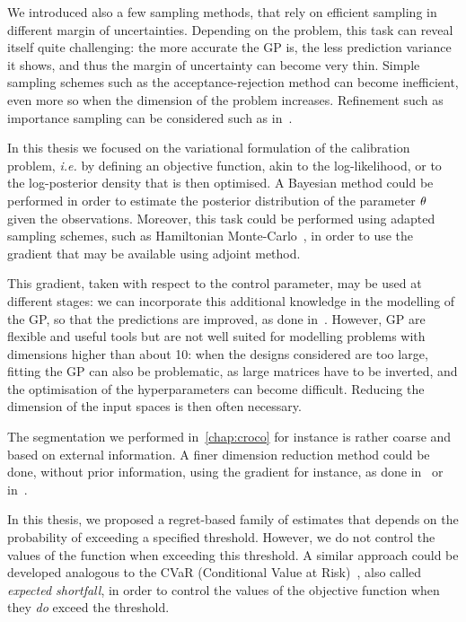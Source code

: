 \documentclass[../../Main_ManuscritThese.tex]{subfiles}
\begin{document}
We introduced also a few sampling methods, that rely on efficient
sampling in different margin of uncertainties. Depending on the
problem, this task can reveal itself quite challenging: the more
accurate the GP is, the less prediction variance it shows, and thus
the margin of uncertainty can become very thin. Simple sampling
schemes such as the acceptance-rejection method can become
inefficient, even more so when the dimension of the problem
increases. Refinement such as importance sampling can be considered
such as in~\cite{razaaly_rare_2019}.

In this thesis we focused on the variational formulation of the
calibration problem, \emph{i.e.} by defining an objective function,
akin to the log-likelihood, or to the log-posterior density that is
then optimised. A Bayesian method could be performed in order to
estimate the posterior distribution of the parameter $\theta$ given the
observations. Moreover, this task could be performed using adapted
sampling schemes, such as Hamiltonian
Monte-Carlo~\cite{betancourt_conceptual_2017}, in order to use the
gradient that may be available using adjoint method.

This gradient, taken with respect to the control parameter, may be
used at different stages: we can incorporate this additional knowledge
in the modelling of the GP, so that the predictions are improved, as
done in~\cite{bouhlel_gradient-enhanced_2019,laurent_overview_2019}.
However, GP are flexible and useful tools but are not well suited for
modelling problems with dimensions higher than about 10: when the
designs considered are too large, fitting the GP can also be
problematic, as large matrices have to be inverted, and the
optimisation of the hyperparameters can become difficult. Reducing the
dimension of the input spaces is then often necessary.

The segmentation we performed in~\cref{chap:croco} for instance is
rather coarse and based on external information. A finer dimension
reduction method could be done, without prior information, using the
gradient for instance, as done in~\cite{benameur_refinement_2002} or
in~\cite{zahm_certified_2018}.


In this thesis, we proposed a regret-based family of estimates that
depends on the probability of exceeding a specified
threshold. However, we do not control the values of the function when
exceeding this threshold. A similar approach could be developed
analogous to the CVaR (Conditional Value at
Risk)~\cite{rockafellar_conditional_2002}, also called \emph{expected
  shortfall}, in order to control the values of the objective function
when they \emph{do} exceed the threshold.
\end{document}
